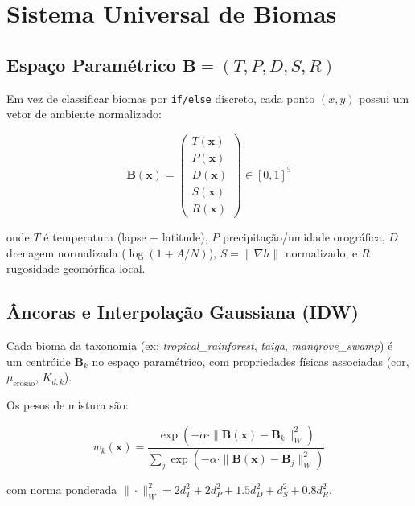 \documentclass[11pt,a4paper]{article}
\begin{document}
\section{Sistema Universal de Biomas}

\subsection{Espaço Paramétrico $\mathbf{B} = (T, P, D, S, R)$}

Em vez de classificar biomas por \texttt{if/else} discreto, cada ponto $(x,y)$ possui
um vetor de ambiente normalizado:

\begin{equation}
  \mathbf{B}(\mathbf{x}) =
  \begin{pmatrix}
    T(\mathbf{x}) \\ P(\mathbf{x}) \\ D(\mathbf{x}) \\ S(\mathbf{x}) \\ R(\mathbf{x})
  \end{pmatrix}
  \in [0,1]^5
  \label{eq:biome-vector}
\end{equation}

onde $T$ é temperatura (lapse + latitude), $P$ precipitação/umidade orográfica,
$D$ drenagem normalizada ($\log(1+A/N)$), $S = \|\nabla h\|$ normalizado, e
$R$ rugosidade geomórfica local.

\subsection{Âncoras e Interpolação Gaussiana (IDW)}

Cada bioma da taxonomia (ex: \emph{tropical\_rainforest}, \emph{taiga}, \emph{mangrove\_swamp})
é um centróide $\mathbf{B}_k$ no espaço paramétrico, com propriedades físicas associadas
(cor, $\mu_{\text{erosão}}$, $K_{d,k}$).

Os pesos de mistura são:

\begin{equation}
  w_k(\mathbf{x}) = \frac{\exp(-\alpha \cdot \|\mathbf{B}(\mathbf{x}) - \mathbf{B}_k\|_W^2)}
  {\sum_j \exp(-\alpha \cdot \|\mathbf{B}(\mathbf{x}) - \mathbf{B}_j\|_W^2)}
  \label{eq:biome-weights}
\end{equation}

com norma ponderada $\|\cdot\|_W^2 = 2d_T^2 + 2d_P^2 + 1.5d_D^2 + d_S^2 + 0.8d_R^2$.
\end{document}
